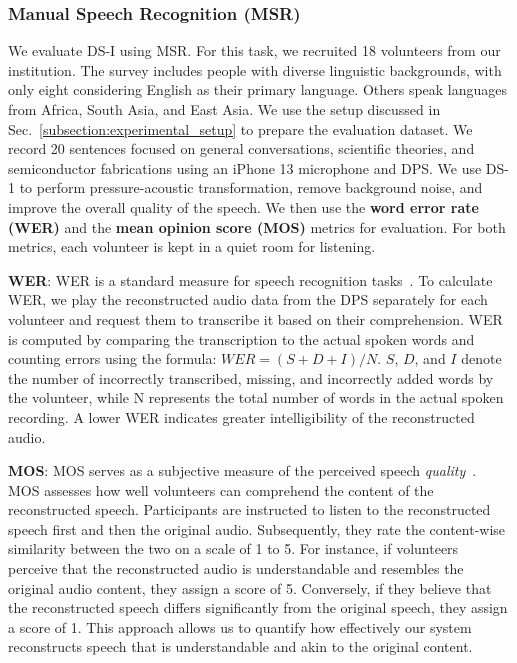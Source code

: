 \subsubsection{\textbf{Manual Speech Recognition (MSR)}}
{
We evaluate DS-I using MSR. For this task, we recruited 18 volunteers from our institution. The survey includes people with diverse linguistic backgrounds, with only eight considering English as their primary language. Others speak languages from Africa, South Asia, and East Asia.
We use the setup discussed in Sec.~\ref{subsection:experimental_setup} to prepare the evaluation dataset.
We record 20 sentences focused on general conversations, scientific theories, and semiconductor fabrications using an iPhone 13 microphone and DPS. 
We use DS-1 to perform pressure-acoustic transformation, remove background noise, and improve the overall quality of the speech. 
We then use the \textbf{word error rate (WER)} and the \textbf{mean opinion score (MOS)} metrics for evaluation. 
For both metrics, each volunteer is kept in a quiet room for listening. 

	
\textbf{WER}: WER is a standard measure for speech recognition tasks~\cite{errattahi2018automatic}. To calculate WER, we play the reconstructed audio data from the DPS separately for each volunteer and request them to transcribe it based on their comprehension. 
WER is computed by comparing the transcription to the actual spoken words and counting errors using the formula: $WER = (S + D + I) / N $.
$S$, $D$, and $I$ denote the number of incorrectly transcribed, missing, and incorrectly added words by the volunteer, while N represents the total number of words in the actual spoken recording. 
A lower WER indicates greater intelligibility of the reconstructed audio.



\textbf{MOS}: MOS serves as a subjective measure of the perceived speech \textit{quality}~\cite{leng2021mbnet}. 
MOS assesses how well volunteers can comprehend the content of the reconstructed speech. 
Participants are instructed to listen to the reconstructed speech first and then the original audio. 
Subsequently, they rate the content-wise similarity between the two on a scale of 1 to 5. 
For instance, if volunteers perceive that the reconstructed audio is understandable and resembles the original audio content, they assign a score of 5. 
Conversely, if they believe that the reconstructed speech differs significantly from the original speech, they assign a score of 1. 
This approach allows us to quantify how effectively our system reconstructs speech that is understandable and akin to the original content.
}


